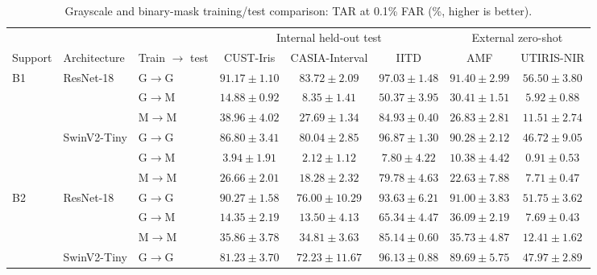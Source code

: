 \begin{table}[!t]
\centering
\caption{Grayscale and binary-mask training/test comparison: TAR at 0.1\% FAR (\%, higher is better).}
\label{tab:e3-gray-mask-tar001}
\begingroup
\small
\setlength{\tabcolsep}{2.5pt}
\renewcommand{\arraystretch}{1.08}
\begin{tabular*}{\textwidth}{@{\extracolsep{\fill}}lllccccc@{}}
\toprule
& & & \multicolumn{3}{c}{Internal held-out test} & \multicolumn{2}{c}{External zero-shot} \\
\cmidrule(lr){4-6}\cmidrule(l){7-8}
Support & Architecture & Train $\to$ test & CUST-Iris & CASIA-Interval & IITD & AMF & UTIRIS-NIR \\
\midrule
\multirow{6}{*}{B1} & \multirow{3}{*}{ResNet-18} & G$\to$G & {\boldmath $91.17\pm1.10$} & {\boldmath $83.72\pm2.09$} & {\boldmath $97.03\pm1.48$} & {\boldmath $91.40\pm2.99$} & {\boldmath $56.50\pm3.80$} \\
 &  & G$\to$M & {\boldmath $14.88\pm0.92$} & {\boldmath $8.35\pm1.41$} & {\boldmath $50.37\pm3.95$} & {\boldmath $30.41\pm1.51$} & {\boldmath $5.92\pm0.88$} \\
 &  & M$\to$M & {\boldmath $38.96\pm4.02$} & {\boldmath $27.69\pm1.34$} & {\boldmath $84.93\pm0.40$} & {\boldmath $26.83\pm2.81$} & {\boldmath $11.51\pm2.74$} \\
\cmidrule(lr){2-8}
 & \multirow{3}{*}{SwinV2-Tiny} & G$\to$G & $86.80\pm3.41$ & $80.04\pm2.85$ & $96.87\pm1.30$ & $90.28\pm2.12$ & $46.72\pm9.05$ \\
 &  & G$\to$M & $3.94\pm1.91$ & $2.12\pm1.12$ & $7.80\pm4.22$ & $10.38\pm4.42$ & $0.91\pm0.53$ \\
 &  & M$\to$M & $26.66\pm2.01$ & $18.28\pm2.32$ & $79.78\pm4.63$ & $22.63\pm7.88$ & $7.71\pm0.47$ \\
\midrule
\multirow{6}{*}{B2} & \multirow{3}{*}{ResNet-18} & G$\to$G & {\boldmath $90.27\pm1.58$} & {\boldmath $76.00\pm10.29$} & $93.63\pm6.21$ & {\boldmath $91.00\pm3.83$} & {\boldmath $51.75\pm3.62$} \\
 &  & G$\to$M & {\boldmath $14.35\pm2.19$} & {\boldmath $13.50\pm4.13$} & {\boldmath $65.34\pm4.47$} & {\boldmath $36.09\pm2.19$} & {\boldmath $7.69\pm0.43$} \\
 &  & M$\to$M & {\boldmath $35.86\pm3.78$} & {\boldmath $34.81\pm3.63$} & {\boldmath $85.14\pm0.60$} & {\boldmath $35.73\pm4.87$} & {\boldmath $12.41\pm1.62$} \\
\cmidrule(lr){2-8}
 & \multirow{3}{*}{SwinV2-Tiny} & G$\to$G & $81.23\pm3.70$ & $72.23\pm11.67$ & {\boldmath $96.13\pm0.88$} & $89.69\pm5.75$ & $47.97\pm2.89$ \\

\end{tabular*}
\end{table}
